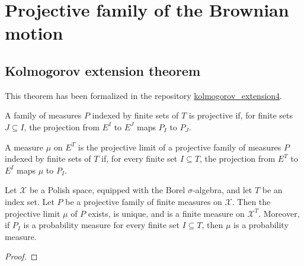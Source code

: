 \chapter{Projective family of the Brownian motion}
\label{chap:projective_family}


\section{Kolmogorov extension theorem}

This theorem has been formalized in the repository \href{https://github.com/RemyDegenne/kolmogorov_extension4}{kolmogorov\_extension4}.

\begin{definition}\label{def:IsProjectiveMeasureFamily}
  \mathlibok
A family of measures $P$ indexed by finite sets of $T$ is projective if, for finite sets $J \subseteq I$, the projection from $E^I$ to $E^J$ maps $P_I$ to $P_J$.
\end{definition}


\begin{definition}\label{def:IsProjectiveLimit}
  \mathlibok
A measure $\mu$ on $E^T$ is the projective limit of a projective family of measures $P$ indexed by finite sets of $T$ if, for every finite set $I \subseteq T$, the projection from $E^T$ to $E^I$ maps $\mu$ to $P_I$.
\end{definition}


\begin{theorem}\label{thm:kolmogorovExtension}
  \leanok
Let $\mathcal{X}$ be a Polish space, equipped with the Borel $\sigma$-algebra, and let $T$ be an index set.
Let $P$ be a projective family of finite measures on $\mathcal{X}$.
Then the projective limit $\mu$ of $P$ exists, is unique, and is a finite measure on $\mathcal{X}^T$.
Moreover, if $P_I$ is a probability measure for every finite set $I \subseteq T$, then $\mu$ is a probability measure.
\end{theorem}

\begin{proof}\leanok

\end{proof}


